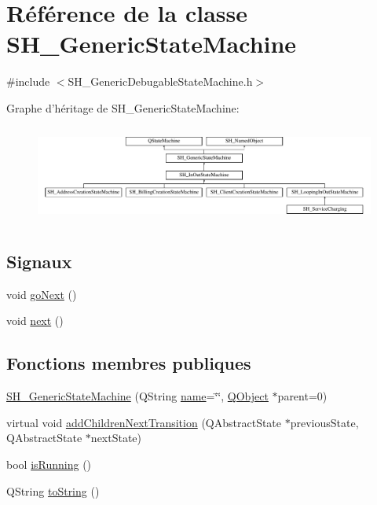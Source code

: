 \hypertarget{classSH__GenericStateMachine}{\section{Référence de la classe S\-H\-\_\-\-Generic\-State\-Machine}
\label{classSH__GenericStateMachine}
}


{\ttfamily \#include $<$S\-H\-\_\-\-Generic\-Debugable\-State\-Machine.\-h$>$}

Graphe d'héritage de S\-H\-\_\-\-Generic\-State\-Machine\-:\begin{figure}[H]
\begin{center}
\leavevmode
\includegraphics[height=3.240741cm]{classSH__GenericStateMachine}
\end{center}
\end{figure}
\subsection*{Signaux}
\begin{DoxyCompactItemize}
\item 
void \hyperlink{classSH__GenericStateMachine_aec37e33524182ab83bf300f1cc1a064e}{go\-Next} ()
\item 
void \hyperlink{classSH__GenericStateMachine_af4771d31d87951c997fba1633c2d67f6}{next} ()
\end{DoxyCompactItemize}
\subsection*{Fonctions membres publiques}
\begin{DoxyCompactItemize}
\item 
\hyperlink{classSH__GenericStateMachine_ac34a1ac375e680e27708097c4f099f59}{S\-H\-\_\-\-Generic\-State\-Machine} (Q\-String \hyperlink{classSH__NamedObject_a9f686c6f2a5bcc08ad03d0cee0151f0f}{name}=\char`\"{}\char`\"{}, \hyperlink{classQObject}{Q\-Object} $\ast$parent=0)
\item 
virtual void \hyperlink{classSH__GenericStateMachine_a22433f8df2f41120a05bfa4bbfa9e0ae}{add\-Children\-Next\-Transition} (Q\-Abstract\-State $\ast$previous\-State, Q\-Abstract\-State $\ast$next\-State)
\item 
bool \hyperlink{classSH__GenericStateMachine_a7e650d582a4c1b8cf2869fb5873b36a9}{is\-Running} ()
\item 
Q\-String \hyperlink{classSH__GenericStateMachine_a85c0c1c9d258ae991f84667412fa47cd}{to\-String} ()
\end{DoxyCompactItemize}
